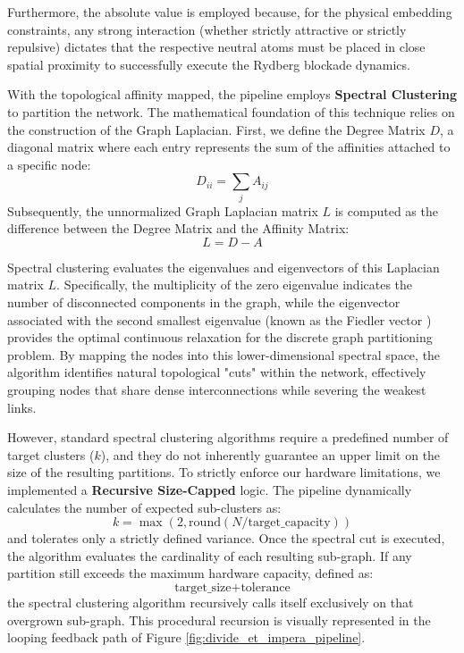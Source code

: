 Furthermore, the absolute value is employed because, for the physical embedding constraints, any strong interaction (whether strictly attractive or strictly repulsive) dictates that the respective neutral atoms must be placed in close spatial proximity to successfully execute the Rydberg blockade dynamics.

With the topological affinity mapped, the pipeline employs \textbf{Spectral Clustering} to partition the network. The mathematical foundation of this technique relies on the construction of the Graph Laplacian. First, we define the Degree Matrix $D$, a diagonal matrix where each entry represents the sum of the affinities attached to a specific node:
\begin{equation}
    D_{ii} = \sum_{j} A_{ij}
\end{equation}
Subsequently, the unnormalized Graph Laplacian matrix $L$ is computed as the difference between the Degree Matrix and the Affinity Matrix:
\begin{equation}
    L = D - A
\end{equation}

Spectral clustering evaluates the eigenvalues and eigenvectors of this Laplacian matrix $L$. Specifically, the multiplicity of the zero eigenvalue indicates the number of disconnected components in the graph, while the eigenvector associated with the second smallest eigenvalue (known as the Fiedler vector \cite{spectral_MA}) provides the optimal continuous relaxation for the discrete graph partitioning problem. By mapping the nodes into this lower-dimensional spectral space, the algorithm identifies natural topological "cuts" within the network, effectively grouping nodes that share dense interconnections while severing the weakest links.

However, standard spectral clustering algorithms require a predefined number of target clusters ($k$), and they do not inherently guarantee an upper limit on the size of the resulting partitions. To strictly enforce our hardware limitations, we implemented a \textbf{Recursive Size-Capped} logic. The pipeline dynamically calculates the number of expected sub-clusters as:
\begin{equation}
    k = \max(2, \text{round}(N / \text{target\_capacity}))
\end{equation}
and tolerates only a strictly defined variance. Once the spectral cut is executed, the algorithm evaluates the cardinality of each resulting sub-graph. If any partition still exceeds the maximum hardware capacity, defined as:
\begin{equation}
    \text{target\_size} + \text{tolerance}
\end{equation}
the spectral clustering algorithm recursively calls itself exclusively on that overgrown sub-graph. This procedural recursion is visually represented in the looping feedback path of Figure \ref{fig:divide_et_impera_pipeline}. 

